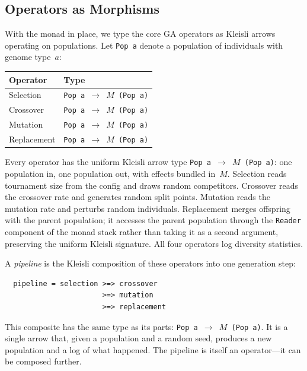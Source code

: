 \documentclass[sigconf,anonymous]{acmart}
\begin{document}
\subsection{Operators as Morphisms}

With the monad in place, we type the core GA operators as Kleisli arrows operating on populations. Let \texttt{Pop\,a} denote a population of individuals with genome type~$a$:

\begin{center}
\begin{tabular}{@{}ll@{}}
\toprule
\textbf{Operator} & \textbf{Type} \\
\midrule
Selection   & \texttt{Pop\,a $\to$ $M$\,(Pop\,a)} \\
Crossover   & \texttt{Pop\,a $\to$ $M$\,(Pop\,a)} \\
Mutation    & \texttt{Pop\,a $\to$ $M$\,(Pop\,a)} \\
Replacement & \texttt{Pop\,a $\to$ $M$\,(Pop\,a)} \\
\bottomrule
\end{tabular}
\end{center}

\noindent Every operator has the uniform Kleisli arrow type \texttt{Pop\,a $\to$ $M$\,(Pop\,a)}: one population in, one population out, with effects bundled in~$M$. Selection reads tournament size from the config and draws random competitors. Crossover reads the crossover rate and generates random split points. Mutation reads the mutation rate and perturbs random individuals. Replacement merges offspring with the parent population; it accesses the parent population through the \texttt{Reader} component of the monad stack rather than taking it as a second argument, preserving the uniform Kleisli signature. All four operators log diversity statistics.

A \emph{pipeline} is the Kleisli composition of these operators into one generation step:

\begin{verbatim}
  pipeline = selection >=> crossover
                       >=> mutation
                       >=> replacement
\end{verbatim}

\noindent This composite has the same type as its parts: \texttt{Pop\,a $\to$ $M$\,(Pop\,a)}. It is a single arrow that, given a population and a random seed, produces a new population and a log of what happened. The pipeline is itself an operator---it can be composed further.
\end{document}
